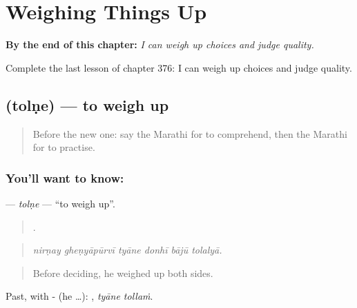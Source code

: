
\chapter{Weighing Things Up}
\label{ch:mr-weighing-things-up}

\begin{chapteropening}
\textbf{By the end of this chapter:} \emph{I can weigh up choices and judge quality.}

Complete the last lesson of chapter 376: I can weigh up choices and judge quality.
\end{chapteropening}

\section[\texorpdfstring{\mr{तोलणे} (tolṇe)}{तोलणे (tolṇe)}]{ (tolṇe) — to weigh up}

\label{lesson:MR-C376-tolne}



\begin{quote}
Before the new one: say the Marathi for to comprehend, then the Marathi for to practise.
\end{quote}

\subsection*{You'll want to know: }
\textbf{} — \emph{tolṇe} — \textquotedblleft{}to weigh up\textquotedblright{}.

\begin{quote}
     .
\end{quote}

\begin{quote}
\emph{nirṇay gheṇyāpūrvī tyāne donhī bājū tolalyā.}
\end{quote}

\begin{quote}
Before deciding, he weighed up both sides.
\end{quote}

Past, with - (he …):  , \emph{tyāne tollaṁ}.

